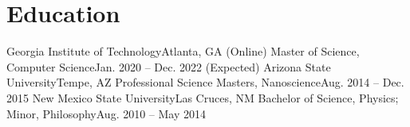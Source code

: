 \section{Education}
  \resumeSubHeadingListStart
    \resumeSubheading
      {Georgia Institute of Technology}{Atlanta, GA (Online)}
      {Master of Science, Computer Science}{Jan. 2020 -- Dec. 2022 (Expected)}
      \resumeItemListStart
      \resumeItemListEnd
    \resumeSubheading
      {Arizona State University}{Tempe, AZ}
      {Professional Science Masters, Nanoscience}{Aug. 2014 -- Dec. 2015}
      \resumeItemListStart
      \resumeItemListEnd
    \resumeSubheading
      {New Mexico State University}{Las Cruces, NM}
      {Bachelor of Science, Physics; Minor, Philosophy}{Aug. 2010 -- May 2014}
      \resumeItemListStart
      \resumeItemListEnd
  \resumeSubHeadingListEnd